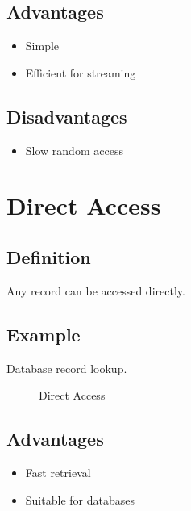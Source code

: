\subsection{Advantages}

\begin{itemize}
\item Simple
\item Efficient for streaming
\end{itemize}

\subsection{Disadvantages}

\begin{itemize}
\item Slow random access
\end{itemize}

\section{Direct Access}

\subsection{Definition}

Any record can be accessed directly.

\subsection{Example}

Database record lookup.

\begin{figure}[h]
\centering
{}
\caption{Direct Access}
\end{figure}

\subsection{Advantages}

\begin{itemize}
\item Fast retrieval
\item Suitable for databases
\end{itemize}


